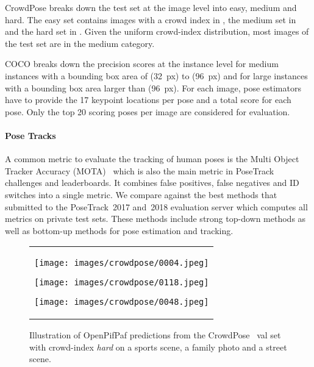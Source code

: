 \documentclass[journal]{IEEEtran}
\begin{document}
CrowdPose breaks down the test set at the image level into easy, medium and hard.
The easy set
contains images with a crowd index in , the medium set in 
and the hard set in . Given the uniform crowd-index distribution,
most images of the test set are in the medium category.

COCO breaks down the precision scores at the instance level for medium
instances with a bounding
box area of (32~px) to (96~px) and for large instances with a bounding
box area larger than (96~px).
For each image, pose estimators have to provide the 17 keypoint locations per pose
and a total score for each pose. Only the top 20 scoring poses per image
are considered for evaluation.



\paragraph{Pose Tracks}
A common metric to evaluate the tracking of human poses is the Multi Object
Tracker Accuracy (MOTA)~\cite{bernardin2008evaluating,milan2016mot16} which
is also the main metric in PoseTrack challenges and leaderboards.
It combines false positives, false negatives and ID switches into a single
metric.
We compare against the best methods that submitted to the
PoseTrack~2017 and~2018 evaluation server which computes all metrics on private
test sets. These methods include strong top-down methods as well as
bottom-up methods for pose estimation and tracking.





\begin{figure*}
  \centering
  \begin{tabular}{c}
\texttt{[image: images/crowdpose/0004.jpeg]}



















    \texttt{[image: images/crowdpose/0118.jpeg]}





\texttt{[image: images/crowdpose/0048.jpeg]}


  \end{tabular}
  \caption{
    Illustration of OpenPifPaf predictions from the
    CrowdPose~\cite{li2019crowdpose} val set with crowd-index \emph{hard} on a
    sports scene, a family photo and a street scene.
  }
  \label{fig:crowdpose-examples}
\end{figure*}
\end{document}
